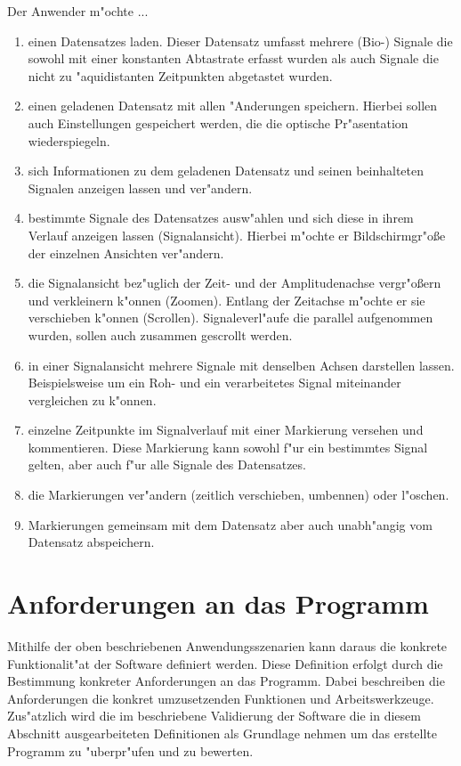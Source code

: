 \renewcommand{\theenumi}{\alph{enumi}}
\renewcommand{\labelenumi}{\theenumi )}
Der Anwender m"ochte ...
\begin{enumerate}
	\item einen Datensatzes laden.
		  Dieser Datensatz umfasst mehrere (Bio-) Signale die sowohl mit einer konstanten Abtastrate erfasst wurden als auch Signale die nicht zu "aquidistanten Zeitpunkten abgetastet wurden.
	\item einen geladenen Datensatz mit allen "Anderungen speichern.
		  Hierbei sollen auch Einstellungen gespeichert werden, die die optische Pr"asentation wiederspiegeln.
	\item sich Informationen zu dem geladenen Datensatz und seinen beinhalteten Signalen anzeigen lassen und ver"andern.
	\item bestimmte Signale des Datensatzes ausw"ahlen und sich diese in ihrem Verlauf anzeigen lassen (Signalansicht).
		  Hierbei m"ochte er Bildschirmgr"o\ss e der einzelnen Ansichten ver"andern.
	\item die Signalansicht bez"uglich der Zeit- und der Amplitudenachse vergr"o\ss ern und verkleinern k"onnen (Zoomen).
		  Entlang der Zeitachse m"ochte er sie verschieben k"onnen (Scrollen).
		  Signaleverl"aufe die parallel aufgenommen wurden, sollen auch zusammen gescrollt werden.
	\item in einer Signalansicht mehrere Signale mit denselben Achsen darstellen lassen.
		  Beispielsweise um ein Roh- und ein verarbeitetes Signal miteinander vergleichen zu k"onnen.
	\item einzelne Zeitpunkte im Signalverlauf mit einer Markierung versehen und kommentieren.
		  Diese Markierung kann sowohl f"ur ein bestimmtes Signal gelten, aber auch f"ur alle Signale des Datensatzes.
	\item die Markierungen ver"andern (zeitlich verschieben, umbennen) oder l"oschen.
	\item Markierungen gemeinsam mit dem Datensatz aber auch unabh"angig vom Datensatz abspeichern.
\end{enumerate}

\section{Anforderungen an das Programm}
\label{sec:anforderungen}

Mithilfe der oben beschriebenen Anwendungsszenarien kann daraus die konkrete Funktionalit"at der Software definiert werden.
Diese Definition erfolgt durch die Bestimmung konkreter Anforderungen an das Programm.
Dabei beschreiben die Anforderungen die konkret umzusetzenden Funktionen und Arbeitswerkzeuge.
Zus"atzlich wird die im  beschriebene Validierung der Software die in diesem Abschnitt ausgearbeiteten Definitionen als Grundlage nehmen um das erstellte Programm zu "uberpr"ufen und zu bewerten.

